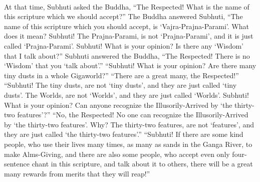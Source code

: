 \documentclass[a5paper,12pt]{book}
\begin{document}
    ~

     At that time, Subhuti asked the Buddha, ``The Respected! What is the name of this scripture which we should accept?'' The Buddha answered Subhuti, ``The name of this scripture which you should accept, is `Vajra-Prajna-Parami'. What does it mean? Subhuti! The Prajna-Parami, is not `Prajna-Parami', and it is just called `Prajna-Parami'. Subhuti! What is your opinion? Is there any `Wisdom' that I talk about?'' Subhuti answered the Buddha, ``The Respected! There is no `Wisdom' that you `talk about'.'' ``Subhuti! What is your opinion? Are there many tiny dusts in a whole Gigaworld?'' ``There are a great many, the Respected!'' ``Subhuti! The tiny dusts, are not `tiny dusts', and they are just called `tiny dusts'. The Worlds, are not `Worlds', and they are just called `Worlds'. Subhuti! What is your opinion? Can anyone recognize the Illusorily-Arrived by `the thirty-two features'?'' ``No, the Respected! No one can recognize the Illusorily-Arrived by `the thirty-two features'. Why? The thirty-two features, are not `features', and they are just called `the thirty-two features'.'' ``Subhuti! If there are some kind people, who use their lives many times, as many as sands in the Ganga River, to make Alms-Giving, and there are also some people, who accept even only four-sentence chant in this scripture, and talk about it to others, there will be a great many rewards from merits that they will reap!''

    ~
\end{document}
